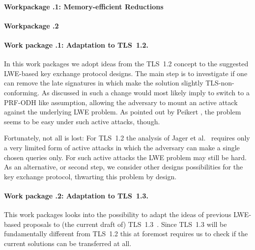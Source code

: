 

\paragraph{Workpackage .1: Memory-efficient Reductions}


\paragraph{Workpackage .2}




\paragraph{Work package .1: Adaptation to TLS~1.2.}

In this work packages we adopt ideas from the TLS~1.2 concept \cite{TLS12} to the suggested LWE-based key exchange protocol designs. The main step is to investigate if one can remove the late signatures in \cite{BCNS15} which make the solution slightly TLS-non-conforming. As discussed in \cite{BCNS15} such a change would most likely imply to switch to a PRF-ODH like assumption, allowing the adversary to mount an active attack against the underlying LWE problem. As pointed out by Peikert \cite{P14}, the problem seems to be easy under such active attacks, though. 

Fortunately, not all is lost: For TLS~1.2 the analysis of Jager et al.~\cite{JKSS12} requires only a very limited form of active attacks in which the adversary can make a single chosen queries only. For such active attacks the LWE problem may still be hard. As an alternative, or second step, we consider other designs possibilities for the key exchange protocol, thwarting this problem by design.


\paragraph{Work package .2: Adaptation to TLS~1.3.}

This work packages looks into the possibility to adapt the ideas of previous LWE-based proposals to (the current draft of) TLS~1.3~\cite{TLS13}. Since TLS~1.3 will be fundamentally different from TLS~1.2 this at foremost requires us to check if the current solutions can be transferred at all. 

